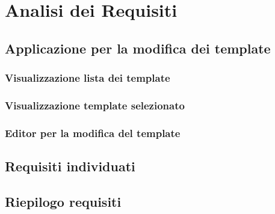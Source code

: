 
\chapter{Analisi dei Requisiti}
\label{cap:analisi-dei-requisiti}

\section{Applicazione per la modifica dei template}

\subsection{Visualizzazione lista dei template}

\subsection{Visualizzazione template selezionato}

\subsection{Editor per la modifica del template}

\section{Requisiti individuati}

\section{Riepilogo requisiti}
